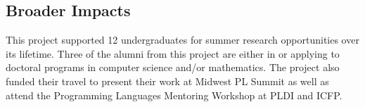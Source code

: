 \subsection*{Broader Impacts}
This project supported 12 undergraduates for summer research opportunities over its lifetime.
Three of the alumni from this project are either in or applying to doctoral programs in computer science and/or mathematics.
The project also funded their travel to present their work at Midwest PL Summit as well as attend the Programming Languages Mentoring Workshop at PLDI and ICFP.